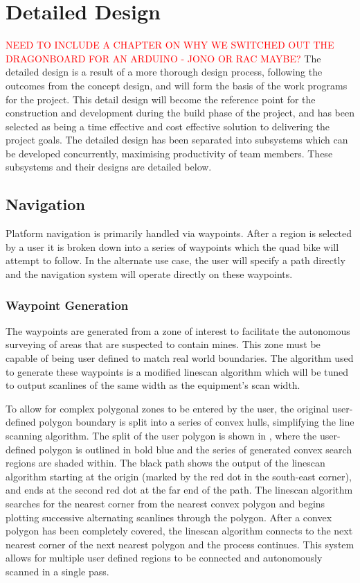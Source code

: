 \documentclass[main.tex]{subfiles}
\begin{document}
\chapter{Detailed Design}

\textcolor{red}{NEED TO INCLUDE A CHAPTER ON WHY WE SWITCHED OUT THE DRAGONBOARD FOR AN ARDUINO - JONO OR RAC MAYBE?}
The detailed design is a result of a more thorough design process, following the outcomes from the concept design, and will form the basis of the work programs for the project. This detail design will become the reference point for the construction and development during the build phase of the project, and has been selected as being a time effective and cost effective solution to delivering the project goals. The detailed design has been separated into subsystems which can be developed concurrently, maximising productivity of team members. These subsystems and their designs are detailed below.

\section{Navigation}
Platform navigation is primarily handled via waypoints. After a region is selected by a user it
is broken down into a series of waypoints which the quad bike will attempt to follow. In the
alternate use case, the user will specify a path directly and the navigation system will operate
directly on these waypoints.
\subsection{Waypoint Generation}
The waypoints are generated from a zone of interest to facilitate the autonomous surveying of areas that are suspected to contain mines. This zone must be capable of being user defined to match real world boundaries. The algorithm used to generate these waypoints is a modified linescan algorithm which will be tuned to output scanlines of the same width as the equipment's scan width.

To allow for complex polygonal zones to be entered by the user, the original user-defined polygon boundary is split into a series of convex hulls, simplifying the line scanning algorithm. The split of the user polygon is shown in , where the user-defined polygon is outlined in bold blue and the series of generated convex search regions are shaded within. The black path shows the output of the linescan algorithm starting at the origin (marked by the red dot in the south-east corner), and ends at the second red dot at the far end of the path. The linescan algorithm searches for the nearest corner from the nearest convex polygon and begins plotting successive alternating scanlines through the polygon. After a convex polygon has been completely covered, the linescan algorithm connects to the next nearest corner of the next nearest polygon and the process continues. This system allows for multiple user defined regions to be connected and autonomously scanned in a single pass.
\end{document}
